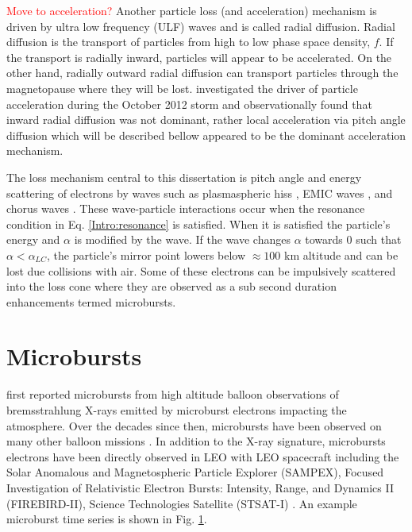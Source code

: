 \textcolor{red}{Move to acceleration?}
Another particle loss (and acceleration) mechanism is driven by ultra low frequency (ULF) waves and is called radial diffusion. Radial diffusion is the transport of particles from high to low phase space density, $f$. If the transport is radially inward, particles will appear to be accelerated. On the other hand, radially outward radial diffusion can transport particles through the magnetopause where they will be lost. \citet{Reeves2013} investigated the driver of particle acceleration during the October 2012 storm and observationally found that inward radial diffusion was not dominant, rather local acceleration via pitch angle diffusion which will be described bellow appeared to be the dominant acceleration mechanism.

The loss mechanism central to this dissertation is pitch angle and energy scattering of electrons by waves such as plasmaspheric hiss \citep[e.g.][]{Breneman2015}, EMIC waves \citep[e.g.][]{Capannolo2019energetic}, and chorus waves \citep[e.g.][]{Breneman2017}. These wave-particle interactions occur when the resonance condition in Eq. \ref{Intro:resonance} is satisfied. When it is satisfied the particle's energy and $\alpha$ is modified by the wave. If the wave changes $\alpha$ towards $0$ such that $\alpha < \alpha_{LC}$, the particle's mirror point lowers below $\approx 100$ km altitude and can be lost due collisions with air. Some of these electrons can be impulsively scattered into the loss cone where they are observed as a sub second duration enhancements termed microbursts.



\section{Microbursts}\label{Intro:microbursts}
\citet{Anderson1964} first reported microbursts from high altitude balloon observations of bremsstrahlung X-rays emitted by microburst electrons impacting the atmosphere. Over the decades since then, microbursts have been observed on many other balloon missions \citep[e.g.][]{Anderson2017, Parks1967, Woodger2015}. In addition to the X-ray signature, microbursts electrons have been directly observed in LEO with LEO spacecraft including the Solar Anomalous and Magnetospheric Particle Explorer (SAMPEX), Focused Investigation of Relativistic Electron Bursts: Intensity, Range, and Dynamics II (FIREBIRD-II), Science Technologies Satellite (STSAT-I)  \citep[e.g.][]{Blake1996, Blum2015, Lorentzen2001a, Lorentzen2001b, Nakamura1995, Nakamura2000, O'Brien2003, O'Brien2004, Crew2016, Breneman2017, Lee2005, Lee2012}. An example microburst time series is shown in Fig. \ref{Intro:microbursts}.

